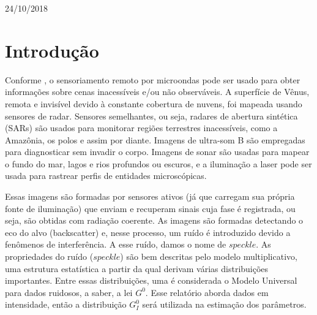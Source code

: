 \documentclass[12pt]{article}
\begin{document}
\begin{titlepage}

{\large 24/10/2018}\\[2cm] %


 

\vfill %

\end{titlepage}


\section{Introdução}

Conforme \citet{FreryMinute2004}, o sensoriamento remoto por microondas pode ser usado para obter informações sobre cenas inacessíveis e/ou não observáveis. A superfície de Vênus, remota e invisível devido à constante cobertura de nuvens, foi mapeada usando sensores de radar. Sensores semelhantes, ou seja, radares de abertura sintética (SARs) são usados para monitorar regiões terrestres inacessíveis, como a Amazônia, os polos e assim por diante. Imagens de ultra-som B são empregadas para diagnosticar sem invadir o corpo. Imagens de sonar são usadas para mapear o fundo do mar, lagos e rios profundos ou escuros, e a iluminação a laser pode ser usada para rastrear perfis de entidades microscópicas.

Essas imagens são formadas por sensores ativos (já que carregam sua própria fonte de iluminação) que enviam e recuperam sinais cuja fase é registrada, ou seja, são  obtidas com radiação coerente. As imagens são formadas detectando o eco do alvo (backscatter) e, nesse processo, um ruído é introduzido devido a fenômenos de interferência. A esse ruído, damos o nome de $speckle$. As propriedades do ruído ($speckle$) são bem descritas pelo modelo multiplicativo, uma estrutura estatística a partir da qual derivam várias distribuições importantes. Entre essas distribuições, uma é considerada o Modelo Universal para dados ruidosos, a saber, a lei $G^{0}$. Esse relatório aborda dados em intensidade, então a distribuição $G_I^0$ será utilizada na estimação dos parâmetros.
\end{document}
